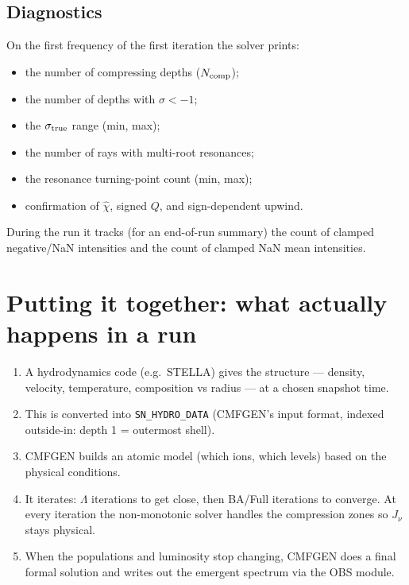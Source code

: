 \documentclass[11pt]{article}
\begin{document}
\subsection{Diagnostics}

On the first frequency of the first iteration the solver prints:
\begin{itemize}[nosep]
  \item the number of compressing depths ($N_{\rm comp}$);
  \item the number of depths with $\sigma < -1$;
  \item the $\sigma_{\rm true}$ range (min, max);
  \item the number of rays with multi-root resonances;
  \item the resonance turning-point count (min, max);
  \item confirmation of $\hat\chi$, signed $Q$, and sign-dependent
        upwind.
\end{itemize}
During the run it tracks (for an end-of-run summary) the count of
clamped negative/NaN intensities and the count of clamped NaN mean
intensities.

\section{Putting it together: what actually happens in a run}

\begin{enumerate}[nosep]
  \item A hydrodynamics code (e.g.\ STELLA) gives the structure ---
        density, velocity, temperature, composition vs radius --- at a
        chosen snapshot time.
  \item This is converted into \texttt{SN\_HYDRO\_DATA} (CMFGEN's input
        format, indexed outside-in: depth 1 = outermost shell).
  \item CMFGEN builds an atomic model (which ions, which levels) based
        on the physical conditions.
  \item It iterates: $\Lambda$ iterations to get close, then BA/Full
        iterations to converge.  At every iteration the non-monotonic
        solver handles the compression zones so $J_\nu$ stays physical.
  \item When the populations and luminosity stop changing, CMFGEN does a
        final formal solution and writes out the emergent spectrum via
        the OBS module.
\end{enumerate}
\end{document}
